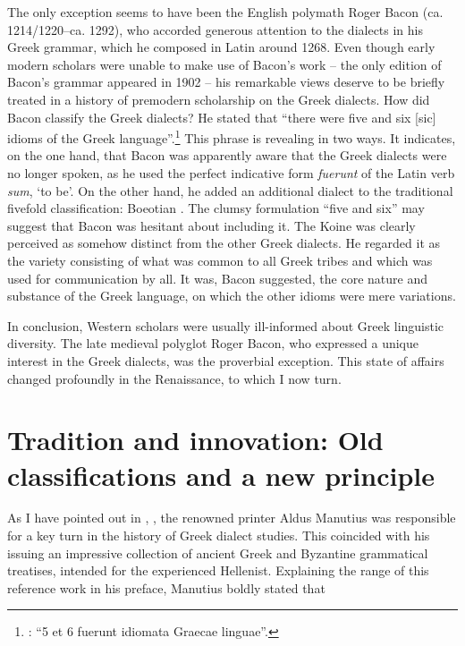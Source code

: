 The only exception seems to have been the English polymath Roger Bacon (ca. 1214/1220–ca. 1292), who accorded generous attention to the dialects in his Greek grammar, which he composed in Latin around 1268. Even though early modern scholars were unable to make use of Bacon’s work – the only edition of Bacon’s grammar appeared in 1902 – his remarkable views deserve to be briefly treated in a history of premodern scholarship on the Greek dialects. How did Bacon classify the Greek dialects? He stated that “there were five and six [sic] idioms of the Greek language”.\footnote{\citet[26]{Bacon1902}: “5 et 6 fuerunt idiomata Graecae linguae”.} This phrase is revealing in two ways. It indicates, on the one hand, that Bacon was apparently aware that the Greek dialects were no longer spoken, as he used the perfect indicative form \textit{fuerunt} of the Latin verb \textit{sum}, ‘to be’. On the other hand, he added an additional dialect to the traditional fivefold classification: Boeotian \citep[27]{Bacon1902}. The clumsy formulation “five and six” may suggest that Bacon was hesitant about including it. The Koine was clearly perceived as somehow distinct from the other Greek dialects. He regarded it as the variety consisting of what was common to all Greek tribes and which was used for communication by all. It was, Bacon suggested, the core nature and substance of the Greek language, on which the other idioms were mere variations.

In conclusion, Western scholars were usually ill-informed about Greek linguistic diversity. The late medieval polyglot Roger Bacon, who expressed a unique interest in the Greek dialects, was the proverbial exception. This state of affairs changed profoundly in the Renaissance, to which I now turn.

\section{Tradition and innovation: Old classifications and a new principle}\label{sec:2.6}

As I have pointed out in , , the renowned printer Aldus Manutius was responsible for a key turn in the history of Greek dialect studies. This coincided with his issuing an impressive collection of ancient Greek and Byzantine grammatical treatises, intended for the experienced Hellenist. Explaining the range of this reference work in his preface, Manutius boldly stated that

